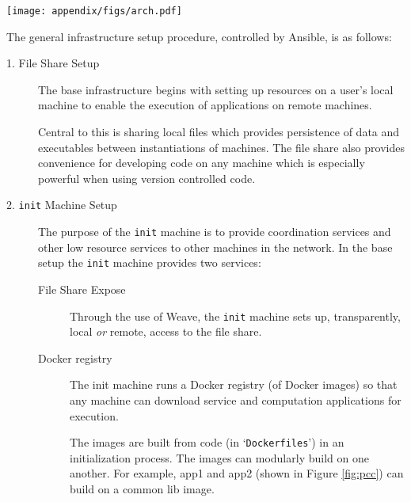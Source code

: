 \begin{sidewaysfigure}[h]

  \texttt{[image: appendix/figs/arch.pdf]}

\caption[Generic infrastructure for distributed computation based on \textsf{Docker}]{
Generic infrastructure for distributed computation based on \textsf{Docker}.
%
Dashed boxes group networks.
%
The (dotted) \textsf{Weave} network crosses network boundaries.
}
\label{fig:pcc}
\end{sidewaysfigure}


The general infrastructure setup procedure, controlled by \textsf{Ansible}, is as follows:

\begin{description}

\item[1. File Share Setup] \hfill 

The base infrastructure begins with setting up resources on a user's local machine to enable the execution of applications on remote machines.


Central to this is sharing local files which provides persistence of data and executables between instantiations of machines.
%
The file share also provides convenience for developing code on any machine which is especially powerful when using version controlled code.


\item[2. \texttt{init} Machine Setup] \hfill

  The purpose of the \texttt{init} machine is to provide coordination services and other low resource services to other machines in the network.
%
In the base setup the \texttt{init} machine provides two services:

  \begin{description}

    \item[File Share Expose] \hfill

      Through the use of \textsf{Weave}, the \texttt{init} machine sets up, transparently, local \emph{or} remote, access to the file share.

    \item[\textsf{Docker} registry] \hfill

      The \textsf{init} machine runs a \textsf{Docker} registry (of \textsf{Docker} images) so that any machine can download service and computation applications for execution.

      The images are built from code (in `\texttt{Dockerfiles}') in an initialization process.
      The images can modularly build on one another.
      For example, \textsf{app1} and \textsf{app2} (shown in Figure \ref{fig:pcc}) can build on a common \textsf{lib} image.


\end{description}
\end{description}
